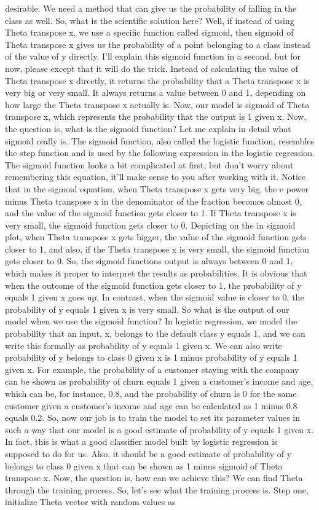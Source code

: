 desirable. We need a method that can give us the probability of falling in the class as well. So, what is the scientific solution here? Well, if instead of using Theta transpose x, we use a specific function called sigmoid, then sigmoid of Theta transpose x gives us the probability of a point belonging to a class instead of the value of y directly. I'll explain this sigmoid function in a second, but for now, please except that it will do the trick. Instead of calculating the value of Theta transpose x directly, it returns the probability that a Theta transpose x is very big or very small. It always returns a value between 0 and 1, depending on how large the Theta transpose x actually is. Now, our model is sigmoid of Theta transpose x, which represents the probability that the output is 1 given x. Now, the question is, what is the sigmoid function? Let me explain in detail what sigmoid really is. The sigmoid function, also called the logistic function, resembles the step function and is used by the following expression in the logistic regression. The sigmoid function looks a bit complicated at first, but don't worry about remembering this equation, it'll make sense to you after working with it. Notice that in the sigmoid equation, when Theta transpose x gets very big, the e power minus Theta transpose x in the denominator of the fraction becomes almost 0, and the value of the sigmoid function gets closer to 1. If Theta transpose x is very small, the sigmoid function gets closer to 0. Depicting on the in sigmoid plot, when Theta transpose x gets bigger, the value of the sigmoid function gets closer to 1, and also, if the Theta transpose x is very small, the sigmoid function gets closer to 0. So, the sigmoid functions output is always between 0 and 1, which makes it proper to interpret the results as probabilities. It is obvious that when the outcome of the sigmoid function gets closer to 1, the probability of y equals 1 given x goes up. In contrast, when the sigmoid value is closer to 0, the probability of y equals 1 given x is very small. So what is the output of our model when we use the sigmoid function? In logistic regression, we model the probability that an input, x, belongs to the default class y equals 1, and we can write this formally as probability of y equals 1 given x. We can also write probability of y belongs to class 0 given x is 1 minus probability of y equals 1 given x. For example, the probability of a customer staying with the company can be shown as probability of churn equals 1 given a customer's income and age, which can be, for instance, 0.8, and the probability of churn is 0 for the same customer given a customer's income and age can be calculated as 1 minus 0.8 equals 0.2. So, now our job is to train the model to set its parameter values in such a way that our model is a good estimate of probability of y equals 1 given x. In fact, this is what a good classifier model built by logistic regression is supposed to do for us. Also, it should be a good estimate of probability of y belongs to class 0 given x that can be shown as 1 minus sigmoid of Theta transpose x. Now, the question is, how can we achieve this? We can find Theta through the training process. So, let's see what the training process is. Step one, initialize Theta vector with random values as 